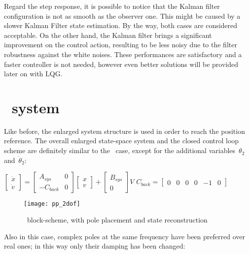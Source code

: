 Regard the step response, it is possible to notice that the Kalman filter configuration is not as smooth as the observer one. This might be caused by a slower Kalman Filter state estimation. By the way, both cases are considered acceptable. On the other hand, the Kalman filter brings a significant improvement on the control action, resulting to be less noisy due to the filter robustness against the white noises.
These performances are satisfactory and a faster controller is not needed, however even better solutions will be provided later on with LQG.
\newpage
\section{\twodof\ system}
Like before, the enlarged system structure is used in order to reach the position reference. The overall enlarged state-space system and the closed control loop scheme are definitely similar to the \onedof\ case, except for the additional variables~$\theta_2$ and~$\dot\theta_2$:
\begin{center}
	$\begin{bmatrix}
		\dot{x} \\
		\dot{v}
	\end{bmatrix}
	=
	\begin{bmatrix}
		A_{sys} & 0 \\
		-C_{back} & 0
	\end{bmatrix}
	\begin{bmatrix}
		x \\
		v
	\end{bmatrix}
	+
	\begin{bmatrix}
		B_{sys} \\
		0
	\end{bmatrix}
	V$		\qquad $ C_{back} =
	\begin{bmatrix}
		0 & 0 & 0 & 0 & -1 & 0
	\end{bmatrix}$
\end{center}
\begin{figure*}[h]
	\centering
	\texttt{[image: pp\_2dof]}
	\caption{\twodof\ block-scheme, with pole placement and state reconstruction}
\end{figure*}
Also in this case, complex poles at the same frequency have been preferred over real ones; in this way only their damping has been changed:
